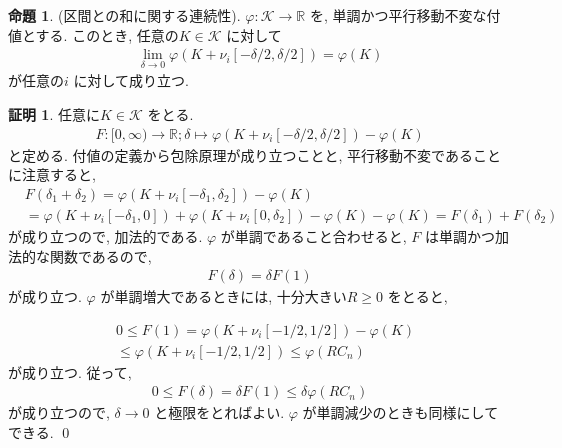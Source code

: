 \documentclass[10pt, fleqn, label-section=none]{bxjsarticle}
\theoremstyle{definition}
\newtheorem{prop}[dfn]{命題}
\newtheorem*{pf*}{証明}
\renewcommand{\;}{\, ; \,}
\begin{document}
\begin{prop}(区間との和に関する連続性). $\varphi : \mathcal K \rightarrow \mathbb R$ を, 単調かつ平行移動不変な付値とする. このとき, 任意の$K \in \mathcal K$ に対して
\begin{align*} \lim_{\delta \rightarrow 0} \varphi(K+ \nu_i [-\delta/2, \delta/2] ) = \varphi(K)   \end{align*}
が任意の$i$ に対して成り立つ. 
\end{prop}
\begin{pf*}任意に$K \in \mathcal K$ をとる. 
\begin{align*} F: [0, \infty) \rightarrow \mathbb R; \delta \mapsto \varphi(K+ \nu_i [-\delta/2, \delta/2] ) - \varphi(K) \end{align*}
と定める. 付値の定義から包除原理が成り立つことと, 平行移動不変であることに注意すると, 
\begin{align*} &F(\delta_1 + \delta_2) =  \varphi(K+ \nu_i [-\delta_1 , \delta _2] ) - \varphi(K) \\&= \varphi(K+ \nu_i [-\delta_1 , 0] ) + \varphi(K+ \nu_i [0 , \delta _2] ) - \varphi(K) - \varphi(K) = F(\delta_1) + F(\delta_2)  \end{align*}
が成り立つので, 加法的である. $\varphi$ が単調であること合わせると, $F$ は単調かつ加法的な関数であるので, 
\begin{align*} F(\delta) = \delta F(1) \end{align*}
が成り立つ. $\varphi$ が単調増大であるときには, 十分大きい$R \geq 0$ をとると, 

\begin{align*} &0 \leq F(1) = \varphi(K+ \nu_i [- 1/2 , 1/2 ] ) - \varphi (K) \\& \leq \varphi(K+ \nu_i [- 1/2 , 1/2 ] )  \leq \varphi(RC_n) \end{align*}
が成り立つ. 従って, 
\begin{align*} 0 \leq F(\delta ) =  \delta F(1) \leq  \delta \varphi(RC_n) \end{align*}
が成り立つので, $\delta \rightarrow 0$ と極限をとればよい. $\varphi$ が単調減少のときも同様にしてできる. 
\qed
\end{pf*}
\end{document}
